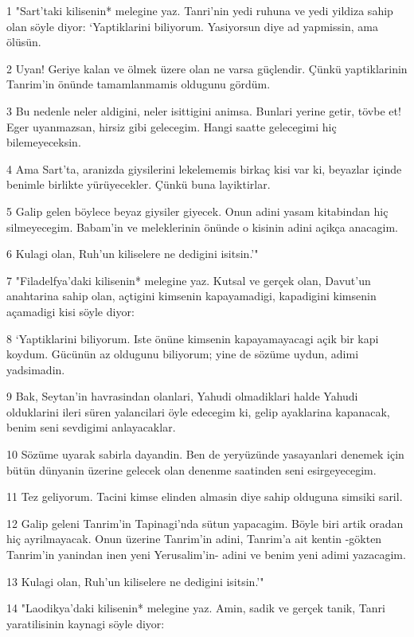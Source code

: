 \par 1 "Sart'taki kilisenin* melegine yaz. Tanri'nin yedi ruhuna ve yedi yildiza sahip olan söyle diyor: `Yaptiklarini biliyorum. Yasiyorsun diye ad yapmissin, ama ölüsün.
\par 2 Uyan! Geriye kalan ve ölmek üzere olan ne varsa güçlendir. Çünkü yaptiklarinin Tanrim'in önünde tamamlanmamis oldugunu gördüm.
\par 3 Bu nedenle neler aldigini, neler isittigini animsa. Bunlari yerine getir, tövbe et! Eger uyanmazsan, hirsiz gibi gelecegim. Hangi saatte gelecegimi hiç bilemeyeceksin.
\par 4 Ama Sart'ta, aranizda giysilerini lekelememis birkaç kisi var ki, beyazlar içinde benimle birlikte yürüyecekler. Çünkü buna layiktirlar.
\par 5 Galip gelen böylece beyaz giysiler giyecek. Onun adini yasam kitabindan hiç silmeyecegim. Babam'in ve meleklerinin önünde o kisinin adini açikça anacagim.
\par 6 Kulagi olan, Ruh'un kiliselere ne dedigini isitsin.'"
\par 7 "Filadelfya'daki kilisenin* melegine yaz. Kutsal ve gerçek olan, Davut'un anahtarina sahip olan, açtigini kimsenin kapayamadigi, kapadigini kimsenin açamadigi kisi söyle diyor:
\par 8 `Yaptiklarini biliyorum. Iste önüne kimsenin kapayamayacagi açik bir kapi koydum. Gücünün az oldugunu biliyorum; yine de sözüme uydun, adimi yadsimadin.
\par 9 Bak, Seytan'in havrasindan olanlari, Yahudi olmadiklari halde Yahudi olduklarini ileri süren yalancilari öyle edecegim ki, gelip ayaklarina kapanacak, benim seni sevdigimi anlayacaklar.
\par 10 Sözüme uyarak sabirla dayandin. Ben de yeryüzünde yasayanlari denemek için bütün dünyanin üzerine gelecek olan denenme saatinden seni esirgeyecegim.
\par 11 Tez geliyorum. Tacini kimse elinden almasin diye sahip olduguna simsiki saril.
\par 12 Galip geleni Tanrim'in Tapinagi'nda sütun yapacagim. Böyle biri artik oradan hiç ayrilmayacak. Onun üzerine Tanrim'in adini, Tanrim'a ait kentin -gökten Tanrim'in yanindan inen yeni Yerusalim'in- adini ve benim yeni adimi yazacagim.
\par 13 Kulagi olan, Ruh'un kiliselere ne dedigini isitsin.'"
\par 14 "Laodikya'daki kilisenin* melegine yaz. Amin, sadik ve gerçek tanik, Tanri yaratilisinin kaynagi söyle diyor:
